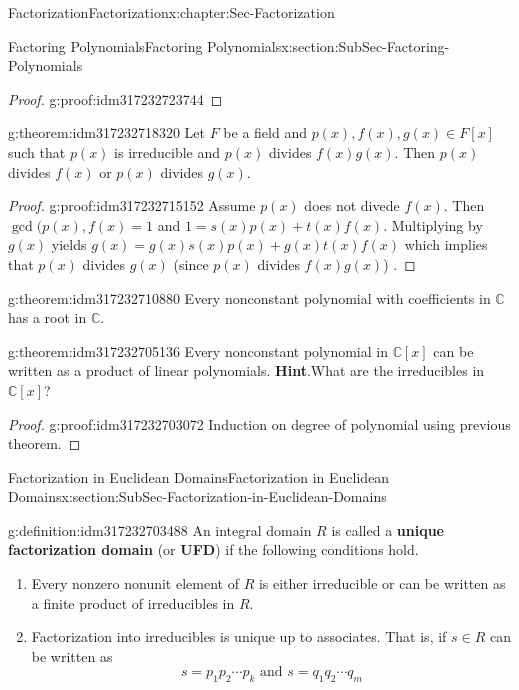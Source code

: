 \documentclass[oneside,10pt,]{book}
\newcommand{\blocktitlefont}{\relax}
\newcommand{\terminology}[1]{\textbf{#1}}
\numberwithin{equation}{section}
\def\C{{\mathbb C}}
\begin{document}
\begin{chapterptx}{Factorization}{}{Factorization}{}{}{x:chapter:Sec-Factorization}
\begin{sectionptx}{Factoring Polynomials}{}{Factoring Polynomials}{}{}{x:section:SubSec-Factoring-Polynomials}
\begin{proof}{}{g:proof:idm317232723744}
\end{proof}
\begin{theorem}{}{}{g:theorem:idm317232718320}%
Let \(F\) be a field and \(p(x),f(x),g(x)\in F[x]\) such that \(p(x)\) is irreducible and \(p(x)\) divides \(f(x) g(x)\). Then \(p(x)\) divides \(f(x)\) or \(p(x)\) divides \(g(x)\).%
\end{theorem}
\begin{proof}{}{g:proof:idm317232715152}
Assume \(p(x)\) does not divede \(f(x)\). Then \(\gcd(p(x),f(x)=1\) and \(1=s(x)p(x)+t(x)f(x)\). Multiplying by \(g(x)\) yields \(g(x)=g(x)s(x)p(x)+g(x)t(x)f(x)\) which implies that \(p(x)\) divides \(g(x)\) (since \(p(x)\) divides \(f(x)g(x)\)) .%
\end{proof}
\begin{theorem}{}{}{g:theorem:idm317232710880}%
Every nonconstant polynomial with coefficients in \(\C\) has a root in \(\C\).%
\end{theorem}
\begin{theorem}{}{}{g:theorem:idm317232705136}%
Every nonconstant polynomial in \(\C[x]\) can be written as a product of linear polynomials.%
\textbf{\blocktitlefont Hint}.\quad{}What are the irreducibles in \(\C[x]\)?%
\end{theorem}
\begin{proof}{}{g:proof:idm317232703072}
Induction on degree of polynomial using previous theorem.%
\end{proof}
\end{sectionptx}
%
%
\typeout{************************************************}
\typeout{************************************************}
%
\begin{sectionptx}{Factorization in Euclidean Domains}{}{Factorization in Euclidean Domains}{}{}{x:section:SubSec-Factorization-in-Euclidean-Domains}
\begin{definition}{}{g:definition:idm317232703488}%
An integral domain \(R\) is called a \terminology{unique factorization domain} (or \terminology{UFD}) if the following conditions hold.%
\begin{enumerate}
\item{}Every nonzero nonunit element of \(R\) is either irreducible or can be written as a finite product of irreducibles in \(R\).%
\item{}Factorization into irreducibles is unique up to associates. That is, if \(s\in R\) can be written as%
\begin{equation*}
s = p_1 p_2 \cdots p_k \text{ and }  s = q_1 q_2 \cdots q_m

\end{equation*}
\end{enumerate}
\end{definition}
\end{sectionptx}
\end{chapterptx}
\end{document}
